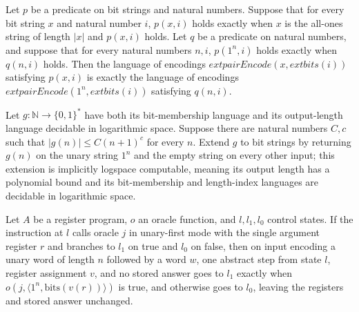 \begin{lemma}
\label{Complexity.indexLang_unaryExt}
\leanok
{}
Let $p$ be a predicate on bit strings and natural numbers. Suppose that for every bit
string $x$ and natural number $i$, $p(x,i)$ holds exactly when $x$ is the all-ones
string of length $|x|$ and $p(x,i)$ holds. Let $q$ be a predicate on natural numbers,
and suppose that for every natural numbers $n,i$, $p(1^n,i)$ holds exactly when $q(n,i)$
holds. Then the language of encodings $	ext{pairEncode}(x,	ext{bits}(i))$ satisfying
$p(x,i)$ is exactly the language of encodings $	ext{pairEncode}(1^n,	ext{bits}(i))$
satisfying $q(n,i)$.
\end{lemma}

\begin{theorem}
\label{Complexity.UnaryLogspace.implicitlyLogspaceComputable}
\leanok
{}
Let $g:\mathbb{N}\to\{0,1\}^*$ have both its bit-membership language and its
output-length language decidable in logarithmic space. Suppose there are natural numbers
$C,c$ such that $|g(n)|\leq C(n+1)^c$ for every $n$. Extend $g$ to bit strings by
returning $g(n)$ on the unary string $1^n$ and the empty string on every other input;
this extension is implicitly logspace computable, meaning its output length has a
polynomial bound and its bit-membership and length-index languages are decidable in
logarithmic space.
\end{theorem}

\begin{lemma}
\leanok
{}
Let $A$ be a register program, $o$ an oracle function, and $l,l_1,l_0$ control states.
If the instruction at $l$ calls oracle $j$ in unary-first mode with the single argument
register $r$ and branches to $l_1$ on true and $l_0$ on false, then on input encoding a
unary word of length $n$ followed by a word $w$, one abstract step from state $l$,
register assignment $v$, and no stored answer goes to $l_1$ exactly when $o(j,\langle
1^n,\mathrm{bits}(v(r))\rangle)$ is true, and otherwise goes to $l_0$, leaving the
registers and stored answer unchanged.
\end{lemma}

